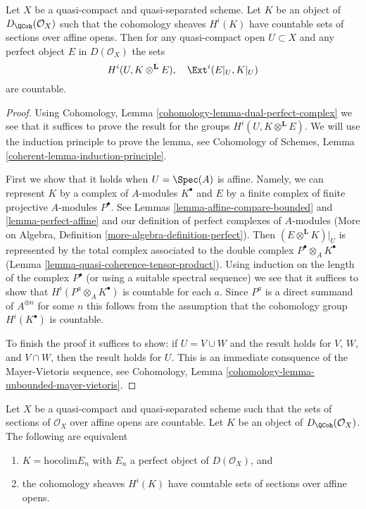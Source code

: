 \begin{lemma}
\label{lemma-countable-cohomology}
Let $X$ be a quasi-compact and quasi-separated scheme.
Let $K$ be an object of $D_\QCoh(\mathcal{O}_X)$
such that the cohomology sheaves $H^i(K)$ have countable
sets of sections over affine opens. Then for any quasi-compact open
$U \subset X$ and any perfect object $E$ in $D(\mathcal{O}_X)$
the sets
$$
H^i(U, K \otimes^\mathbf{L} E),\quad \Ext^i(E|_U, K|_U)
$$
are countable.
\end{lemma}

\begin{proof}
Using Cohomology, Lemma \ref{cohomology-lemma-dual-perfect-complex}
we see that it suffices to prove the result
for the groups $H^i(U, K \otimes^\mathbf{L} E)$.
We will use the induction principle to prove the lemma, see
Cohomology of Schemes, Lemma \ref{coherent-lemma-induction-principle}.

\medskip\noindent
First we show that it holds when $U = \Spec(A)$ is affine. Namely, we can
represent $K$ by a complex of $A$-modules $K^\bullet$ and $E$ by a
finite complex of finite projective $A$-modules $P^\bullet$.
See Lemmas \ref{lemma-affine-compare-bounded} and
\ref{lemma-perfect-affine}
and our definition of perfect complexes of $A$-modules
(More on Algebra, Definition \ref{more-algebra-definition-perfect}).
Then $(E \otimes^\mathbf{L} K)|_U$ is represented by
the total complex associated to the double complex
$P^\bullet \otimes_A K^\bullet$
(Lemma \ref{lemma-quasi-coherence-tensor-product}).
Using induction on the length of the complex
$P^\bullet$ (or using a suitable spectral sequence)
we see that it suffices to show that
$H^i(P^a \otimes_A K^\bullet)$ is countable for each $a$.
Since $P^a$ is a direct summand of $A^{\oplus n}$ for
some $n$ this follows from the assumption that
the cohomology group $H^i(K^\bullet)$ is countable.

\medskip\noindent
To finish the proof it suffices to show: if $U = V \cup W$
and the result holds for $V$, $W$, and $V \cap W$, then
the result holds for $U$. This is an immediate consquence
of the Mayer-Vietoris sequence, see
Cohomology, Lemma \ref{cohomology-lemma-unbounded-mayer-vietoris}.
\end{proof}

\begin{lemma}
\label{lemma-countable}
Let $X$ be a quasi-compact and quasi-separated scheme such that
the sets of sections of $\mathcal{O}_X$ over affine opens are countable.
Let $K$ be an object of $D_\QCoh(\mathcal{O}_X)$. The
following are equivalent
\begin{enumerate}
\item $K = \text{hocolim} E_n$ with $E_n$ a perfect object of
$D(\mathcal{O}_X)$, and
\item the cohomology sheaves $H^i(K)$ have countable
sets of sections over affine opens.
\end{enumerate}
\end{lemma}

